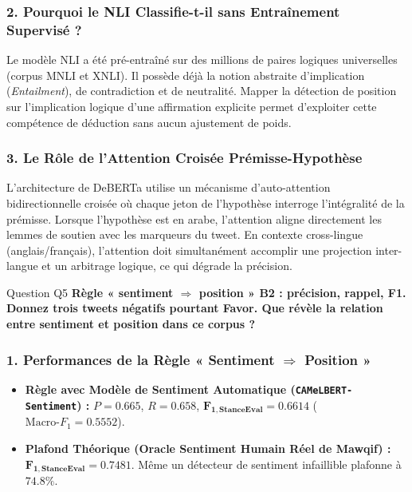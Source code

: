 \documentclass[11pt,a4paper]{article}
\begin{document}
\subsubsection*{2. Pourquoi le NLI Classifie-t-il sans Entraînement Supervisé ?}
Le modèle NLI a été pré-entraîné sur des millions de paires logiques universelles (corpus MNLI et XNLI). Il possède déjà la notion abstraite d'implication (\textit{Entailment}), de contradiction et de neutralité. Mapper la détection de position sur l'implication logique d'une affirmation explicite permet d'exploiter cette compétence de déduction sans aucun ajustement de poids.

\subsubsection*{3. Le Rôle de l'Attention Croisée Prémisse-Hypothèse}
L'architecture de DeBERTa utilise un mécanisme d'auto-attention bidirectionnelle croisée où chaque jeton de l'hypothèse interroge l'intégralité de la prémisse. Lorsque l'hypothèse est en arabe, l'attention aligne directement les lemmes de soutien avec les marqueurs du tweet. En contexte cross-lingue (anglais/français), l'attention doit simultanément accomplir une projection inter-langue et un arbitrage logique, ce qui dégrade la précision.

\vspace{0.3cm}

\begin{questionbox}{Question Q5}
\textbf{Règle « sentiment $\Rightarrow$ position » B2 : précision, rappel, F1. Donnez trois tweets négatifs pourtant Favor. Que révèle la relation entre sentiment et position dans ce corpus ?}
\end{questionbox}

\subsubsection*{1. Performances de la Règle « Sentiment $\Rightarrow$ Position »}
\begin{itemize}[noitemsep]
    \item \textbf{Règle avec Modèle de Sentiment Automatique (\texttt{CAMeLBERT-Sentiment}) :}  
    $P = 0.665$, \quad $R = 0.658$, \quad $\mathbf{F_{1,\text{StanceEval}} = 0.6614}$ \quad ($\text{Macro-}F_1 = 0.5552$).
    \item \textbf{Plafond Théorique (Oracle Sentiment Humain Réel de Mawqif) :} $\mathbf{F_{1,\text{StanceEval}} = 0.7481}$. Même un détecteur de sentiment infaillible plafonne à $74.8\%$.
\end{itemize}
\end{document}
